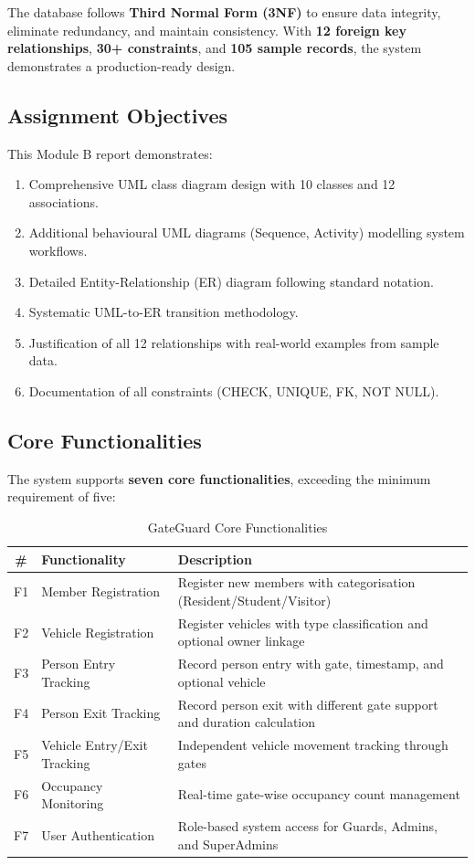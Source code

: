 \documentclass[a4paper, 12pt]{article}
\begin{document}
The database follows \textbf{Third Normal Form (3NF)} to ensure data integrity, eliminate redundancy, and maintain consistency. With \textbf{12 foreign key relationships}, \textbf{30+ constraints}, and \textbf{105 sample records}, the system demonstrates a production-ready design.

\subsection{Assignment Objectives}

This Module B report demonstrates:
\begin{enumerate}[leftmargin=*, nosep]
    \item Comprehensive UML class diagram design with 10 classes and 12 associations.
    \item Additional behavioural UML diagrams (Sequence, Activity) modelling system workflows.
    \item Detailed Entity-Relationship (ER) diagram following standard notation.
    \item Systematic UML-to-ER transition methodology.
    \item Justification of all 12 relationships with real-world examples from sample data.
    \item Documentation of all constraints (CHECK, UNIQUE, FK, NOT NULL).
\end{enumerate}

\subsection{Core Functionalities}

The system supports \textbf{seven core functionalities}, exceeding the minimum requirement of five:

\begin{table}[H]
\centering
\caption{GateGuard Core Functionalities}
\label{tab:functionalities}
\begin{tabularx}{\textwidth}{c l X}
\toprule
\textbf{\#} & \textbf{Functionality} & \textbf{Description} \\
\midrule
F1 & Member Registration & Register new members with categorisation (Resident/Student/Visitor) \\
F2 & Vehicle Registration & Register vehicles with type classification and optional owner linkage \\
F3 & Person Entry Tracking & Record person entry with gate, timestamp, and optional vehicle \\
F4 & Person Exit Tracking & Record person exit with different gate support and duration calculation \\
F5 & Vehicle Entry/Exit Tracking & Independent vehicle movement tracking through gates \\
F6 & Occupancy Monitoring & Real-time gate-wise occupancy count management \\
F7 & User Authentication & Role-based system access for Guards, Admins, and SuperAdmins \\
\bottomrule
\end{tabularx}
\end{table}
\end{document}

